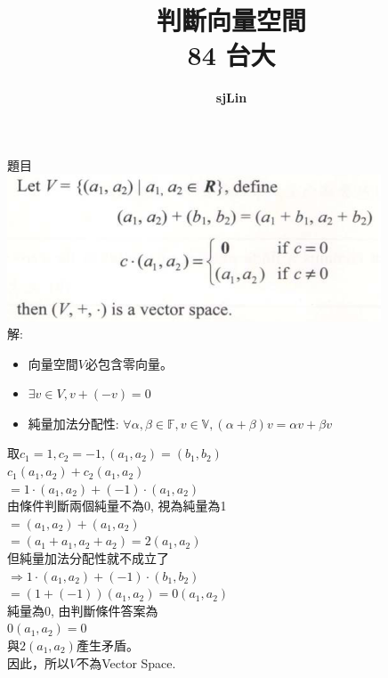 \documentclass{article}
\title{判斷向量空間\\84 台大}
\author{\textbf{sjLin}}
\begin{document}
\begin{CJK*}{UTF8}{bkai}
{\selectfont
\maketitle
\noindent
題目\\	
\includegraphics[scale=1]{./images/determine_vector_space.png}
\\
解:
\begin{itemize}
	\item 向量空間$V$必包含零向量。 
	\item $\exists v\in V, v+(-v)=0$
	\item 純量加法分配性: $\forall\alpha,\beta\in \mathbb{F}, v\in \mathbb{V}, (\alpha+\beta)v=\alpha v+\beta v$
\end{itemize}
取$c_1=1, c_2=-1,(a_1,a_2)=(b_1,b_2) $\\	
$
c_1(a_1,a_2)+c_2(a_1,a_2)
$\\
$
= 1\cdot(a_1,a_2)+(-1)\cdot(a_1,a_2)
$\\
由條件判斷兩個純量不為0, 視為純量為1\\
$
= (a_1,a_2)+(a_1,a_2)
$\\	
$
=(a_1+a_1, a_2+a_2)=2(a_1,a_2)
$\\
但純量加法分配性就不成立了\\
$\Rightarrow 1\cdot(a_1,a_2)+(-1)\cdot(b_1,b_2)$\\
$=(1+(-1))(a_1,a_2)=0(a_1,a_2)$\\
純量為0, 由判斷條件答案為\\
$0(a_1,a_2)=0$\\
與$2(a_1,a_2)$產生矛盾。\\
因此，所以$V$不為Vector Space.
} %
\end{CJK*}
\end{document}
